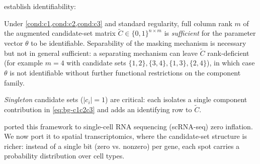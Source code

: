 \citet[Theorem 8]{towell2026masked} establish identifiability:

\begin{theorem}
\label{thm:bg-id}
Under \cref{cond:c1,cond:c2,cond:c3} and standard regularity, full
column rank $m$ of the augmented candidate-set matrix $\tilde{C}
\in \{0,1\}^{n \times m}$ is \emph{sufficient} for the parameter
vector $\theta$ to be identifiable. Separability of the masking
mechanism is necessary but not in general sufficient: a separating
mechanism can leave $\tilde{C}$ rank-deficient (for example $m=4$
with candidate sets $\{1,2\},\{3,4\},\{1,3\},\{2,4\}$), in which
case $\theta$ is not identifiable without further functional
restrictions on the component family.
\end{theorem}

\emph{Singleton} candidate sets ($|c_i|=1$) are critical: each
isolates a single component contribution in
\eqref{eq:bg-c1c2c3} and adds an identifying row to $\tilde{C}$.

\citet{towell2026scrnacoarsening} ported this framework to
single-cell RNA sequencing (scRNA-seq) zero inflation. We now port
it to spatial transcriptomics, where the candidate-set structure is
richer: instead of a single bit (zero vs. nonzero) per gene, each
spot carries a probability distribution over cell types.

